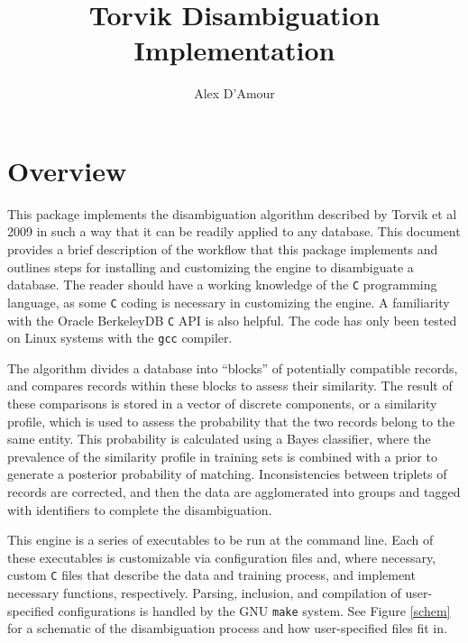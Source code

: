 \documentclass[10pt, letterpaper]{article}
\title{Torvik Disambiguation Implementation}
\author{Alex D'Amour}
\begin{document}
\maketitle
\section{Overview}
This package implements the disambiguation algorithm described by Torvik et al 2009
in such a way that it can be readily applied to any database.
This document provides a brief description of the workflow that this package implements and
outlines steps for installing and customizing the engine to disambiguate a database.
The reader should have a working knowledge of the \texttt{C} programming language, as
some \texttt{C} coding is necessary in customizing the engine. A familiarity with the Oracle
BerkeleyDB \texttt{C} API is also helpful. The code has only been tested on Linux systems
with the \texttt{gcc} compiler.

The algorithm divides a database into ``blocks'' of potentially compatible records, and compares
records within these blocks to assess their similarity. The result
of these comparisons is stored in a vector of discrete components, or a similarity profile,
which is used to assess the probability that the two records belong to the same entity.
This probability is calculated using a Bayes classifier, where the prevalence of the 
similarity profile in training sets is combined with a prior to generate a posterior probability
of matching. Inconsistencies between triplets of records are corrected, and then the data
are agglomerated into groups and tagged with identifiers to complete the disambiguation.

This engine is a series of executables to be run at the command line. Each of these executables
is customizable via configuration files and, where necessary, custom \texttt{C} files that describe
the data and training process, and implement necessary functions, respectively. Parsing, inclusion,
and compilation of user-specified configurations is handled by the GNU \texttt{make} system. See
Figure \ref{schem} for a schematic of the disambiguation process and how user-specified files
fit in.
\end{document}
